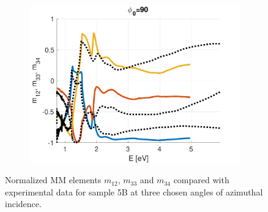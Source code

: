 \begin{figure}[h!]
\begin{subfigure}{0.32\linewidth}
        \includegraphics[width=\linewidth, trim= 0cm 0cm 2cm 0cm, clip]{figures/ch4/S5B/NCS/S5B_NCS_phi90.pdf}
   \end{subfigure}
   \caption{Normalized MM elements $m_{12}$, $m_{33}$ and $m_{34}$ compared with experimental data for sample 5B at three chosen angles of azimuthal incidence.}
   \label{fig:S5A_NCS}
\end{figure}




